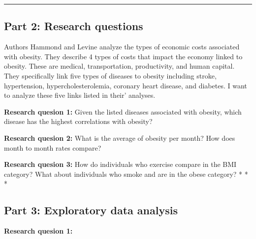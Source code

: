 \documentclass[
]{article}
\newenvironment{Shaded}{\begin{snugshade}}{\end{snugshade}}
\newcommand{\KeywordTok}[1]{\textcolor[rgb]{0.13,0.29,0.53}{\textbf{#1}}}
\newcommand{\NormalTok}[1]{#1}
\newcommand{\OperatorTok}[1]{\textcolor[rgb]{0.81,0.36,0.00}{\textbf{#1}}}
\newcommand{\StringTok}[1]{\textcolor[rgb]{0.31,0.60,0.02}{#1}}
\begin{document}
\begin{center}\rule{0.5\linewidth}{0.5pt}\end{center}

\hypertarget{part-2-research-questions}{%
\subsection{Part 2: Research
questions}\label{part-2-research-questions}}

Authors Hammond and Levine analyze the types of economic costs
associated with obesity. They describe 4 types of costs that impact the
economy linked to obesity. These are medical, transportation,
productivity, and human capital. They specifically link five types of
diseases to obesity including stroke, hypertension,
hypercholesterolemia, coronary heart disease, and diabetes. I want to
analyze these five links listed in their' analyses.

\textbf{Research quesion 1:} Given the listed diseases associated with
obesity, which disease has the highest correlations with obesity?

\textbf{Research quesion 2:} What is the average of obesity per month?
How does month to month rates compare?

\textbf{Research quesion 3:} How do individuals who exercise compare in
the BMI category? What about individuals who smoke and are in the obese
category? * * *

\hypertarget{part-3-exploratory-data-analysis}{%
\subsection{Part 3: Exploratory data
analysis}\label{part-3-exploratory-data-analysis}}

\textbf{Research quesion 1:}

\begin{Shaded}
\end{Shaded}
\end{document}
